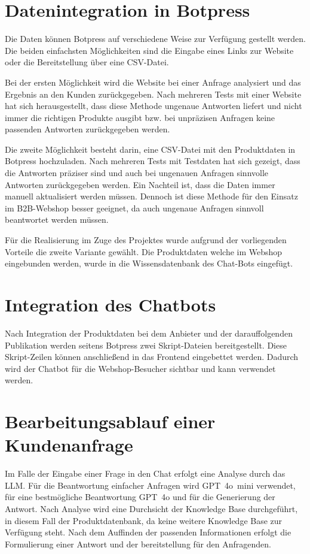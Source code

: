 \documentclass[%
	12pt,
	a4paper,
	oneside,
	parskip=full
]{scrbook}
\begin{document}
\section{Datenintegration in Botpress}
Die Daten können Botpress auf verschiedene Weise zur Verfügung gestellt werden. 
Die beiden einfachsten Möglichkeiten sind die Eingabe eines Links zur Website oder die Bereitstellung über eine CSV-Datei.

Bei der ersten Möglichkeit wird die Website bei einer Anfrage analysiert und das Ergebnis an den Kunden zurückgegeben. 
Nach mehreren Tests mit einer Website hat sich herausgestellt, dass diese Methode ungenaue Antworten liefert und nicht immer die richtigen Produkte ausgibt bzw. bei unpräzisen Anfragen keine passenden Antworten zurückgegeben werden.

Die zweite Möglichkeit besteht darin, eine CSV-Datei mit den Produktdaten in Botpress hochzuladen. 
Nach mehreren Tests mit Testdaten hat sich gezeigt, dass die Antworten präziser sind und auch bei ungenauen Anfragen sinnvolle Antworten zurückgegeben werden. 
Ein Nachteil ist, dass die Daten immer manuell aktualisiert werden müssen. 
Dennoch ist diese Methode für den Einsatz im B2B-Webshop besser geeignet, da auch ungenaue Anfragen sinnvoll beantwortet werden müssen.  

Für die Realisierung im Zuge des Projektes wurde aufgrund der vorliegenden Vorteile die zweite Variante gewählt. Die Produktdaten welche im Webshop eingebunden werden, wurde in die Wissensdatenbank des Chat-Bots eingefügt.

\section{Integration des Chatbots}
Nach Integration der Produktdaten bei dem Anbieter und der darauffolgenden Publikation werden seitens Botpress zwei Skript-Dateien bereitgestellt. Diese Skript-Zeilen können anschließend in das Frontend eingebettet werden. Dadurch wird der Chatbot für die Webshop-Besucher sichtbar und kann verwendet werden.

\section{Bearbeitungsablauf einer Kundenanfrage}
Im Falle der Eingabe einer Frage in den Chat erfolgt eine Analyse durch das LLM. Für die Beantwortung einfacher Anfragen wird GPT~4o~mini verwendet, für eine bestmögliche Beantwortung GPT~4o und für die Generierung der Antwort. Nach Analyse wird eine Durchsicht der Knowledge Base durchgeführt, in diesem Fall der Produktdatenbank, da keine weitere Knowledge Base zur Verfügung steht. Nach dem Auffinden der passenden Informationen erfolgt die Formulierung einer Antwort und der bereitstellung für den Anfragenden.
\end{document}
